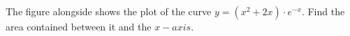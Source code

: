 
%
%
%
%
% 
% 

\question[4] The figure alongside shows the plot of the curve $y=(x^2+2x)\cdot e^{-x}$.
Find the area contained between it and the $x-axis$.


\ifprintanswers
\fi 

